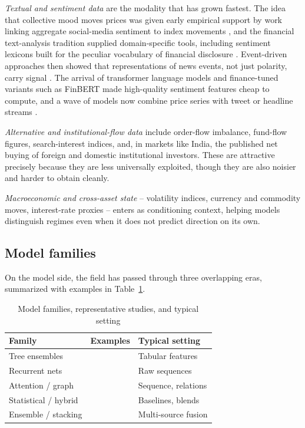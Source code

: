 \documentclass[10pt,a4paper,twocolumn]{article}
\begin{document}
\textit{Textual and sentiment data} are the modality that has grown fastest. The idea that collective mood moves prices was given early empirical support by work linking aggregate social-media sentiment to index movements \cite{bollen2011}, and the financial text-analysis tradition supplied domain-specific tools, including sentiment lexicons built for the peculiar vocabulary of financial disclosure \cite{loughran2011}. Event-driven approaches then showed that representations of news events, not just polarity, carry signal \cite{ding2015}. The arrival of transformer language models \cite{vaswani2017,devlin2019} and finance-tuned variants such as FinBERT \cite{araci2019} made high-quality sentiment features cheap to compute, and a wave of models now combine price series with tweet or headline streams \cite{xu2018,hu2018}.

\textit{Alternative and institutional-flow data} include order-flow imbalance, fund-flow figures, search-interest indices, and, in markets like India, the published net buying of foreign and domestic institutional investors. These are attractive precisely because they are less universally exploited, though they are also noisier and harder to obtain cleanly.

\textit{Macroeconomic and cross-asset state} -- volatility indices, currency and commodity moves, interest-rate proxies -- enters as conditioning context, helping models distinguish regimes even when it does not predict direction on its own.

\subsection{Model families}

On the model side, the field has passed through three overlapping eras, summarized with examples in Table~\ref{tab:models}.

\begin{table}[tb]
\centering
\caption{Model families, representative studies, and typical setting}
\label{tab:models}
{\footnotesize
\begin{tabular}{p{2.0cm} p{2.4cm} p{2.1cm}}
\toprule
\textbf{Family} & \textbf{Examples} & \textbf{Typical setting} \\
\midrule
Tree ensembles & \cite{breiman2001,chen2016,ke2017,krauss2017} & Tabular features \\
Recurrent nets & \cite{hochreiter1997,fischer2018,selvin2017} & Raw sequences \\
Attention / graph & \cite{vaswani2017,feng2019,sawhney2020} & Sequence, relations \\
Statistical / hybrid & \cite{zhang2003,bao2017} & Baselines, blends \\
Ensemble / stacking & \cite{thakkar2021} & Multi-source fusion \\
\bottomrule
\end{tabular}}
\end{table}
\end{document}
